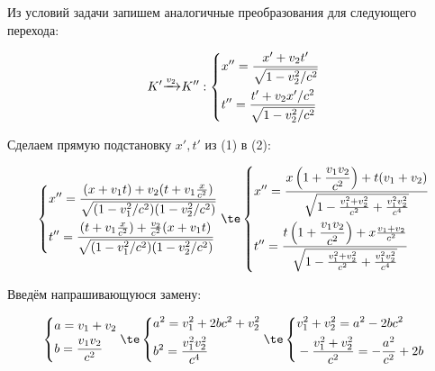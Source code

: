 \documentclass[12pt]{kiarticle}
\begin{document}
Из условий задачи запишем аналогичные преобразования для следующего перехода:

\begin{equation}
K' {\large \xrightarrow{v_2}} K'':
\left\{
\begin{aligned}
&x'' = \dfrac{x' + v_2t'}{\sqrt{1-v_2^2/c^2}} \\
&t'' = \dfrac{t' + v_2x'/c^2}{\sqrt{1-v_2^2/c^2}} \\
\end{aligned}
\right.
\end{equation}

Сделаем прямую подстановку  $ x', t' $ из (1) в (2):

\begin{equation}
\left\{
\begin{aligned}
&x'' = \dfrac{(x + v_1t) + v_2(t + v_1\frac{x}{c^2})}
{\sqrt{ (1-v_1^2/c^2)(1-v_2^2/c^2) }} \\
&t'' = \dfrac{(t + v_1\frac{x}{c^2}) + \frac{v_2}{c^2}(x + v_1t)}
{\sqrt{ (1-v_1^2/c^2)(1-v_2^2/c^2) }}\\
\end{aligned}
\right.
\te
\left\{
\begin{aligned}
&x'' = \dfrac{x\left( 1 + \dfrac{v_1v_2}{c^2}\right)  + t(v_1 + v_2)}
{\sqrt{ 1 - \frac{v_1^2+v_2^2}{c^2}  + \frac{v_1^2v_2^2}{c^4}}} \\
&t'' = \dfrac{t\left( 1 + \dfrac{v_1v_2}{c^2}\right)  + x\frac{v_1 + v_2}{c^2}}
{\sqrt{ 1 - \frac{v_1^2+v_2^2}{c^2} + \frac{v_1^2v_2^2}{c^4}}}\\
\end{aligned}
\right.
\end{equation}

Введём напрашивающуюся замену:

\begin{equation}
\left\{
\begin{aligned}
&a = v_1 + v_2 \\
&b = \dfrac{v_1v_2}{c^2}\\
\end{aligned}
\right.
\te
\left\{
\begin{aligned}
&a^2 = v_1^2 + 2bc^2 + v_2^2 \\
&b^2 = \dfrac{v_1^2v_2^2}{c^4}\\
\end{aligned}
\right.
\te 
\left\{
\begin{aligned}
&v_1^2 + v_2^2 = a^2 - 2bc^2  \\
&-\frac{v_1^2 + v_2^2}{c^2} = -\frac{a^2}{c^2} + 2b \\
\end{aligned}
\right.
\end{equation}
\end{document}
